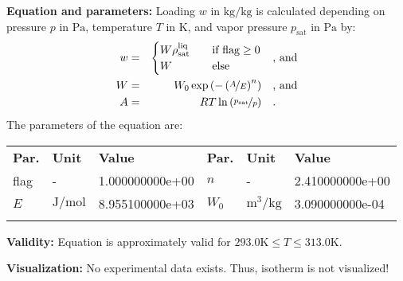 \textbf{Equation and parameters:}
\newline
%
Loading $w$ in $\si{\kilogram\per\kilogram}$ is calculated depending on pressure $p$ in $\si{\pascal}$, temperature $T$ in $\si{\kelvin}$, and vapor pressure $p_\mathrm{sat}$ in $\si{\pascal}$ by:
%
\begin{equation*}
\begin{split}
w &=& \begin{cases} W \rho_\mathrm{sat}^{\mathrm{liq}} & \quad \text{if flag} \geq 0 \\ W & \quad \text{else} \end{cases} & \quad\text{, and} \\
W &=& W_0 \exp \left( - \left( \nicefrac{A}{E} \right) ^{n} \right) & \quad\text{, and} \\
A &=& R T \ln \left( \nicefrac{p_\mathrm{sat}}{p} \right) & \quad\text{.} \\
\end{split}
\end{equation*}
%
The parameters of the equation are:
%
\begin{longtable}[l]{lll|lll}
\toprule
\addlinespace
\textbf{Par.} & \textbf{Unit} & \textbf{Value} &	\textbf{Par.} & \textbf{Unit} & \textbf{Value} \\
\addlinespace
\midrule
\endhead

\bottomrule
\endfoot
\bottomrule
\endlastfoot
\addlinespace

flag & - & 1.000000000e+00 & $n$ & - & 2.410000000e+00 \\
$E$ & $\si{\joule\per\mole}$ & 8.955100000e+03 & $W_0$ & $\si{\cubic\meter\per\kilogram}$ & 3.090000000e-04 \\

\addlinespace\end{longtable}

\textbf{Validity:}
\newline
Equation is approximately valid for $293.0 \si{\kelvin} \leq T \leq 313.0 \si{\kelvin}$.
\newline

\textbf{Visualization:}
%
\newline
No experimental data exists. Thus, isotherm is not visualized!
%

\FloatBarrier
\newpage
